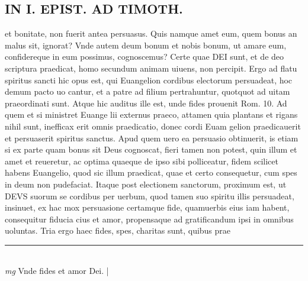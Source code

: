 \documentclass{article}
\begin{document}
\begin{pages}
\section*{IN I. EPIST. AD TIMOTH. }\pstart et bonitate, non fuerit antea persuasus. Quis namque amet eum, quem bonus an malus sit, ignorat? Vnde autem deum bonum et nobis bonum, ut amare eum, confidereque in eum possimus, cognoscemus? Certe quae DEI sunt, et de deo scriptura praedicat, homo secundum animam uiuens, non percipit.   \pend\pstart Ergo ad flatu spiritus sancti hic opus est, qui Euangelion cordibus electorum persuadeat, hoc demum pacto uo cantur, et a patre ad filium pertrahuntur, quotquot ad uitam praeordinati sunt.  Atque hic auditus ille est, unde fides prouenit Rom. 10.  Ad quem et si ministret Euange lii externus praeco, attamen quia plantans et rigans nihil sunt, inefficax erit omnis praedicatio, donec cordi Euam gelion praedicauerit et persuaserit spiritus sanctus.  Apud quem uero ea persuasio obtinuerit, is etiam si ex parte quam bonus sit Deus cognoscat, fieri tamen non potest, quin illum et amet et reueretur, ac optima quaeque de ipso sibi polliceatur, fidem scilicet habens Euangelio, quod sic illum praedicat, quae et certo consequetur, cum spes in deum non pudefaciat.  Itaque post electionem sanctorum, proximum est, ut DEVS suorum se cordibus per uerbum, quod tamen suo spiritu illis persuadeat, insinuet, ex hac mox persuasione certamque fide, quamuerbis eius iam habent, consequitur fiducia cius et amor, propensaque ad gratificandum ipsi in omnibus uoluntas.   \pend\pstart Tria ergo haec fides, spes, charitas sunt, quibus prae\pend
\vspace{0.5cm}\noindent
\vspace{0.2cm}\rule{1cm}{0.2pt}\\ 
\hspace{0.2cm}\textit{mg}
\footnotesize Vnde fides et amor Dei.  
\normalsize| 
\endnumbering
\end{pages}
\end{document}
